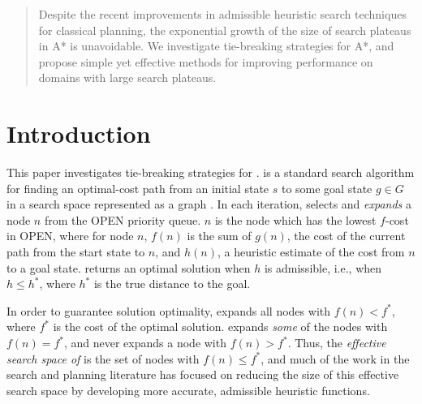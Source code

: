 


\begin{abstract}
Despite the recent improvements in admissible heuristic search techniques
for classical planning, the exponential growth of
the size of search plateaus in A* is unavoidable.
We investigate tie-breaking strategies for A*, and propose simple yet effective methods for improving performance on domains with large search plateaus.

\end{abstract}

\section{Introduction}
\label{sec-1}


This paper investigates tie-breaking strategies for \astar.
\astar is a standard search algorithm for finding an optimal-cost path 
from an initial state $s$ to some goal state $g \in G$ in a search space represented as a graph \cite{hart1968formal}.
In each iteration, \astar selects and \emph{expands} a node $n$ from the OPEN priority queue.
$n$ is the node which has the lowest $f$-cost in OPEN, where for node $n$, $f(n)$ is the sum of  $g(n)$, the cost of the current path from the start state to $n$, and $h(n)$, a heuristic estimate of the cost from $n$ to a goal state.
\astar returns an optimal solution when $h$ is admissible, i.e., when $h \leq h^*$, where $h^*$ is the true distance to the goal.


In order to guarantee solution optimality, \astar expands all
nodes with $f(n) < f^*$, where $f^*$ is the cost of the optimal solution.
\astar expands \emph{some} of the nodes with $f(n) = f^*$, and never expands a node with $f(n) > f^*$.
Thus, the \emph{effective search space of \astar} is the set of nodes with 
$f(n) \leq f^*$, and
much of the work in the search and planning literature  has focused
on reducing the size of this effective search space by
developing more accurate, admissible heuristic functions.

